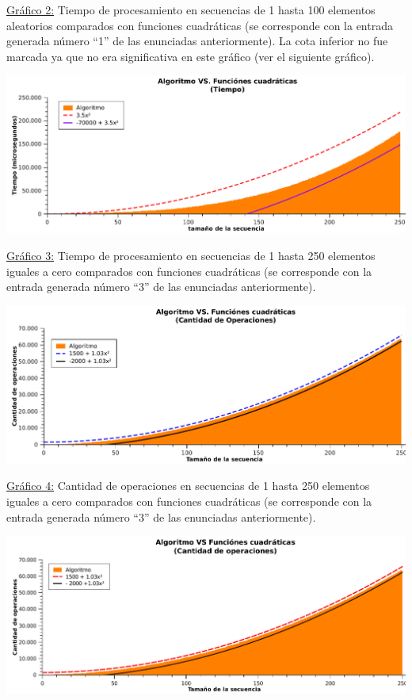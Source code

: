 \underline{Gráfico 2:} Tiempo de procesamiento en secuencias de 1 hasta 100 elementos aleatorios comparados con funciones cuadráticas (se corresponde con la entrada generada número ``1'' de las enunciadas anteriormente). La cota inferior no fue marcada ya que no era significativa en este gráfico (ver el siguiente gráfico).

 \vspace*{1cm}
\hspace*{-2.1cm}\includegraphics[width=475pt]{../ej1/graficos/tiempo0.pdf}

\underline{Gráfico 3:} Tiempo de procesamiento en secuencias de 1 hasta 250 elementos iguales a cero comparados con funciones cuadráticas (se corresponde con la entrada generada número ``3'' de las enunciadas anteriormente).

 \vspace*{1cm}
\hspace*{-2.1cm}\includegraphics[width=475pt]{../ej1/graficos/operaciones0.pdf}

\underline{Gráfico 4:} Cantidad de operaciones en secuencias de 1 hasta 250 elementos iguales a cero comparados con funciones cuadráticas (se corresponde con la entrada generada número ``3'' de las enunciadas anteriormente).


 \vspace*{1cm}
\hspace*{-2.1cm}\includegraphics[width=475pt]{../ej1/graficos/operaciones250.pdf}

